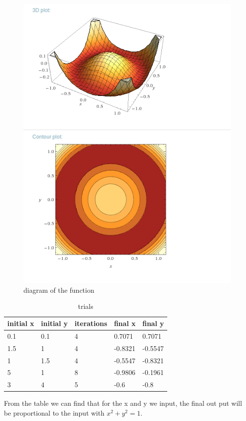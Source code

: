 \documentclass[11pt,letterpaper]{article}
\begin{document}
\begin{figure}
\begin{center}
\includegraphics[width=0.8\linewidth,angle=0]{p1.png}
\caption{diagram of the function}
\label{figure1}
\end{center}
\end{figure}


\begin{table}[h]
\caption{trials\label{table1}}
\begin{tabular}{l l l l l}
\hline
 \textbf{initial x } & \textbf{initial y} & \textbf{iterations} & \textbf{final x}& \textbf{final y}\\
\hline
0.1 & 0.1 & 4 & 0.7071 & 0.7071 \\
1.5 & 1 & 4 & -0.8321 & -0.5547 \\
1 & 1.5 & 4 & -0.5547 & -0.8321 \\
5 & 1 & 8 & -0.9806 & -0.1961 \\
3 & 4 & 5 & -0.6 & -0.8 \\
\hline
\end{tabular}
\end{table}
From the table we can find that for the x and y we input, the final out put will be proportional to the input with $x^2+y^2=1$. 
\end{document}

